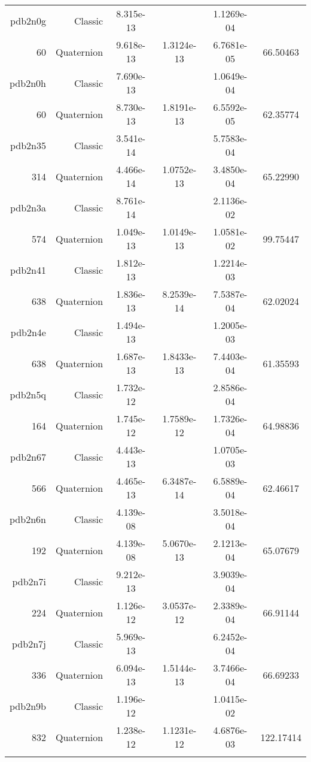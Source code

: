 \begin{xltabular}{\textwidth}{r|rS[table-format=1.3e+2]S[table-format=1.4e+2]S[table-format=1.4e+2]S[table-format=-1.5]}
pdb2n0g & Classic & 8.315e-13 &  & 1.1269e-04 & \\
60 & Quaternion & 9.618e-13 & 1.3124e-13 & 6.7681e-05 & 66.50463\\  \addlinespace
pdb2n0h & Classic & 7.690e-13 &  & 1.0649e-04 & \\
60 & Quaternion & 8.730e-13 & 1.8191e-13 & 6.5592e-05 & 62.35774\\  \addlinespace
pdb2n35 & Classic & 3.541e-14 &  & 5.7583e-04 & \\
314 & Quaternion & 4.466e-14 & 1.0752e-13 & 3.4850e-04 & 65.22990\\  \addlinespace
pdb2n3a & Classic & 8.761e-14 &  & 2.1136e-02 & \\
574 & Quaternion & 1.049e-13 & 1.0149e-13 & 1.0581e-02 & 99.75447\\  \addlinespace
pdb2n41 & Classic & 1.812e-13 &  & 1.2214e-03 & \\
638 & Quaternion & 1.836e-13 & 8.2539e-14 & 7.5387e-04 & 62.02024\\  \addlinespace
pdb2n4e & Classic & 1.494e-13 &  & 1.2005e-03 & \\
638 & Quaternion & 1.687e-13 & 1.8433e-13 & 7.4403e-04 & 61.35593\\  \addlinespace
pdb2n5q & Classic & 1.732e-12 &  & 2.8586e-04 & \\
164 & Quaternion & 1.745e-12 & 1.7589e-12 & 1.7326e-04 & 64.98836\\  \addlinespace
pdb2n67 & Classic & 4.443e-13 &  & 1.0705e-03 & \\
566 & Quaternion & 4.465e-13 & 6.3487e-14 & 6.5889e-04 & 62.46617\\  \addlinespace
pdb2n6n & Classic & 4.139e-08 &  & 3.5018e-04 & \\
192 & Quaternion & 4.139e-08 & 5.0670e-13 & 2.1213e-04 & 65.07679\\  \addlinespace
pdb2n7i & Classic & 9.212e-13 &  & 3.9039e-04 & \\
224 & Quaternion & 1.126e-12 & 3.0537e-12 & 2.3389e-04 & 66.91144\\  \addlinespace
pdb2n7j & Classic & 5.969e-13 &  & 6.2452e-04 & \\
336 & Quaternion & 6.094e-13 & 1.5144e-13 & 3.7466e-04 & 66.69233\\  \addlinespace
pdb2n9b & Classic & 1.196e-12 &  & 1.0415e-02 & \\
832 & Quaternion & 1.238e-12 & 1.1231e-12 & 4.6876e-03 & 122.17414\\  \addlinespace

\end{xltabular}
